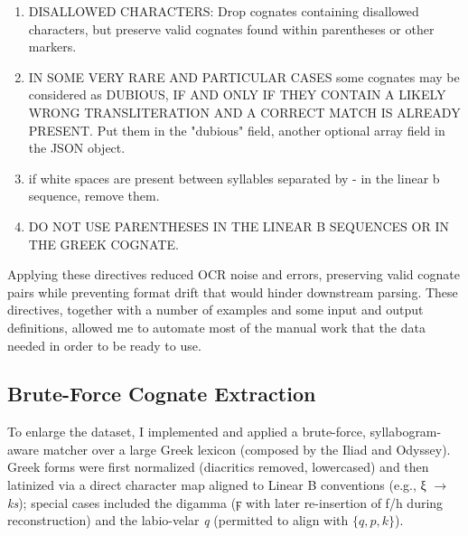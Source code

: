 \begin{enumerate}[label=\textbf{\arabic*.}, leftmargin=2.5em]
\item DISALLOWED CHARACTERS: Drop cognates containing disallowed characters, but preserve valid cognates found within parentheses or other markers.

\item IN SOME VERY RARE AND PARTICULAR CASES some cognates may be considered as DUBIOUS, IF AND ONLY IF THEY CONTAIN A LIKELY WRONG TRANSLITERATION AND A CORRECT MATCH IS ALREADY PRESENT. Put them in the "dubious" field, another optional array field in the JSON object.

\item if white spaces are present between syllables separated by - in the linear b sequence, remove them.

\item DO NOT USE PARENTHESES IN THE LINEAR B SEQUENCES OR IN THE GREEK COGNATE.
\end{enumerate}

Applying these directives reduced OCR noise and errors, preserving valid cognate pairs while preventing format drift that would hinder downstream parsing.
These directives, together with a number of examples and some input and output definitions, allowed me to automate most of the manual work that the data needed in order to be ready to use.

\subsection{Brute-Force Cognate Extraction} \label{sec:bruteforce-cognates}

To enlarge the dataset, I implemented and applied a brute-force, syllabogram-aware matcher over a large Greek lexicon (composed by the Iliad and Odyssey).
Greek forms were first normalized (diacritics removed, lowercased) and then latinized via a direct character map aligned to Linear B conventions (e.g., \textgreek{ξ} $\rightarrow$ \textit{ks}); 
special cases included the digamma (\textgreek{ϝ} with later re-insertion of f/h during reconstruction) and the
labio-velar \textit{q} (permitted to align with $\{q,p,k\}$).


